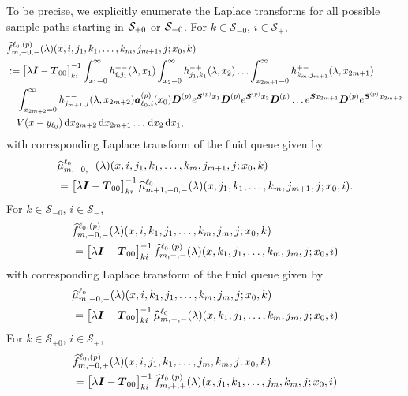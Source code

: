 To be precise, we explicitly enumerate the Laplace transforms for all possible sample paths starting in \(\mathcal{S}_{+0}\) or \(\mathcal{S}_{-0}\). For \(k\in\mathcal S_{-0}\), \(i\in\mathcal S_+\),
\begin{align}
	&\widehat{f}_{m,-0,-}^{\ell_0,(p)}(\lambda)(x,i,j_1,k_1,\dots,k_m,j_{m+1},j;x_0,k)\nonumber 
	\\&:=\begin{bmatrix} \lambda \boldsymbol I - \boldsymbol T_{00} \end{bmatrix}^{-1}_{ki}\int_{x_1=0}^\infty h^{+-}_{i,j_{1}}(\lambda,x_1)\nonumber
	\int_{x_2=0}^\infty h^{-+}_{j_1,k_1}(\lambda,x_2)
	\hdots \int_{x_{2m+1}=0}^\infty h^{+-}_{k_{m},j_{m+1}}(\lambda, x_{2m+1}) 
	\\&\quad \int_{x_{2m+2}=0}^\infty h^{--}_{j_{m+1},j}(\lambda,x_{2m+2})
	 \boldsymbol   a_{\ell_0,i}^{(p)}(x_0)\boldsymbol D^{(p)}e^{\boldsymbol{S}^{(p)}x_1} \boldsymbol{D}^{(p)} e^{\boldsymbol{S}^{(p)}x_2} \boldsymbol{D}^{(p)}\dots e^{\boldsymbol{S}x_{2m+1}}  \boldsymbol{D}^{(p)}e^{\boldsymbol{S}^{(p)}x_{2m+2}} \nonumber 
	 \\&\quad{} V(x-y_{\ell_0})  \, \mathrm{d} x_{2m+2} \, \mathrm{d} x_{2m+1}\dots\, \mathrm{d} x_2 \, \mathrm{d} x_1,\label{eqn: k0jJ0AAAAA}
\end{align}
with corresponding Laplace transform of the fluid queue given by
\begin{align}
	&\widehat \mu_{m,-0,-}^{\ell_0}(\lambda)(x,i,j_1,k_1,\dots,k_m,j_{m+1},j;x_0,k)\nonumber 
	\\& = \begin{bmatrix} \lambda \boldsymbol I - \boldsymbol T_{00} \end{bmatrix}^{-1}_{ki} \widehat \mu_{m+1,-0,-}^{\ell_0}(\lambda)(x,j_1,k_1,\dots,k_m,j_{m+1},j;x_0,i) .
\end{align}
For \(k\in\mathcal S_{-0}\), \(i\in\mathcal S_-\),
\begin{align}
		&\widehat{f}_{m,-0,-}^{\ell_0,(p)}(\lambda)(x,i,k_1,j_1,\dots,k_m,j_m,j;x_0,k)  \nonumber
		\\&=\begin{bmatrix} \lambda \boldsymbol I - \boldsymbol T_{00} \end{bmatrix}^{-1}_{ki}\widehat{f}_{m,-,-}^{\ell_0,(p)}(\lambda)(x,k_1,j_1,\dots,k_m,j_m,j;x_0,i)
		\label{eqn: k0jJ0asfc134}
\end{align} 
with corresponding Laplace transform of the fluid queue given by 
\begin{align}
	&\widehat \mu_{m,-0,-}^{\ell_0}(\lambda)(x,i,k_1,j_1,\dots,k_m,j_m,j;x_0,k)\nonumber 
	\\&= \begin{bmatrix} \lambda \boldsymbol I - \boldsymbol T_{00} \end{bmatrix}^{-1}_{ki}\widehat \mu_{m,-,-}^{\ell_0}(\lambda)(x,k_1,j_1,\dots,k_m,j_m,j;x_0,i)
\end{align}
For \(k\in\mathcal S_{+0}\), \(i\in\mathcal S_+\),
\begin{align}
		&\widehat{f}_{m,+0,+}^{\ell_0,(p)}(\lambda)(x,i,j_1,k_1,\dots,j_m,k_m,j;x_0,k) \nonumber 
		\\&=\begin{bmatrix} \lambda \boldsymbol I - \boldsymbol T_{00} \end{bmatrix}^{-1}_{ki}\widehat{f}_{m,+,+}^{\ell_0,(p)}(\lambda)(x,j_1,k_1,\dots,j_m,k_m,j;x_0,i)
		\label{eqn: k0jJ0asfca134}
\end{align} 
